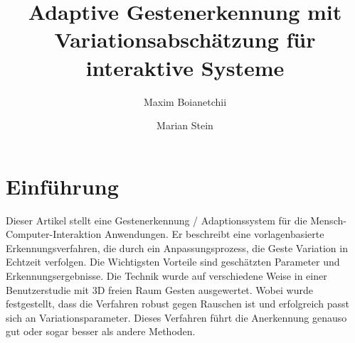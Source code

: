 \documentclass{llncs}
\begin{document}
\pagestyle{headings}

\mainmatter

\title{Adaptive Gestenerkennung mit Variationsabschätzung für interaktive Systeme}


\author{Maxim Boianetchii \and Marian Stein}



\maketitle
\section{Einführung}
Dieser Artikel stellt eine Gestenerkennung / Adaptionssystem für die Mensch-Computer-Interaktion Anwendungen. Er beschreibt eine vorlagenbasierte Erkennungsverfahren, die durch ein Anpassungsprozess, die Geste Variation in Echtzeit verfolgen. Die Wichtigsten Vorteile sind geschätzten Parameter und Erkennungsergebnisse. Die Technik wurde auf verschiedene Weise in einer Benutzerstudie mit 3D freien Raum Gesten ausgewertet. Wobei wurde festgestellt, dass die Verfahren robust gegen Rauschen ist und erfolgreich passt sich an Variationsparameter. Dieses Verfahren führt die Anerkennung genauso gut oder sogar besser als andere Methoden.
\end{document}
